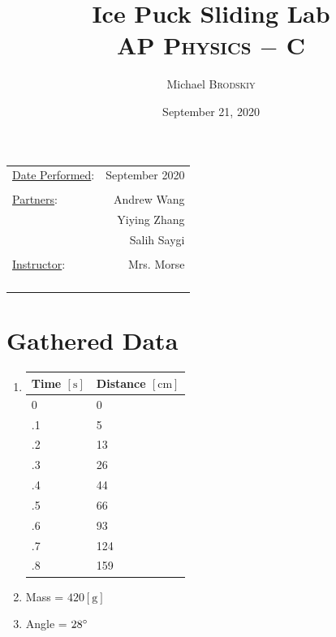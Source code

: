 \documentclass{article}
\title{Ice Puck Sliding Lab \\ AP \textsc{Physics} $-$ C}
\author{Michael \textsc{Brodskiy}}
\date{September 21, 2020}
\begin{document}
\maketitle
\begin{center}
\begin{tabular}{l r}
\underline{Date Performed}: & September 2020 \\\\ %
\underline{Partners}: & Andrew Wang \\ & Yiying Zhang \\ & Salih Saygi \\\\
\underline{Instructor}: & Mrs. Morse \\\\\\\\\\ %
\end{tabular}
\end{center}
\newpage
    
\section{Gathered Data}

\begin{enumerate}

  \item \begin{tabular}{|l|l|}

  \hline
  Time $[\si{\second}]$ & Distance $[\si{\centi\meter}]$ \\
  \hline
   0 & 0  \\
  \hline
  .1 & 5  \\
  \hline
  .2 & 13 \\
  \hline
  .3 & 26 \\
  \hline
  .4 & 44 \\
  \hline
  .5 & 66 \\
  \hline
  .6 & 93 \\
  \hline
  .7 & 124\\
  \hline
  .8 & 159\\
  \hline

\end{tabular}

\item Mass = $420[\si{\gram}]$

\item Angle = $28\degree$

\end{enumerate}
\end{document}

